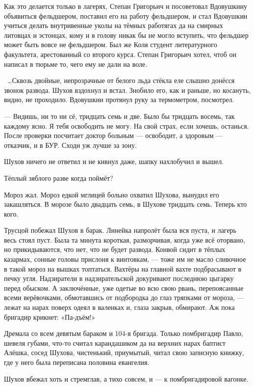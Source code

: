 Как это делается только в лагерях, Степан Григорьич и посоветовал Вдовушкину объявиться 
фельдшером, поставил его на работу фельдшером, и стал Вдовушкин учиться делать внутривенные 
уколы на тёмных работягах да на смирных литовцах и эстонцах, кому и в голову никак бы не 
могло вступить, что фельдшер может быть вовсе не фельдшером. Был же Коля студент 
литературного факультета, арестованный со второго курса. Степан Григорьич хотел, чтоб он 
написал в тюрьме то, чего ему не дали на воле.

~\dots{}Сквозь двойные, непрозрачные от белого льда стёкла еле слышно донёсся звонок развода. 
Шухов вздохнул и встал. Знобило его, как и раньше, но косануть, видно, не проходило. Вдовушкин 
протянул руку за термометром, посмотрел.

--- Видишь, ни то ни сё, тридцать семь и две. Было бы тридцать восемь, так каждому ясно. Я тебя 
освободить не могу. На свой страх, если хочешь, останься. После проверки посчитает доктор 
больным --- освободит, а здоровым --- отказчик, и в БУР. Сходи уж лучше за зону.

Шухов ничего не ответил и не кивнул даже, шапку нахлобучил и вышел.

Тёплый зяблого разве когда поймёт?

Мороз жал. Мороз едкой мглицей больно охватил Шухова, вынудил его закашляться. В морозе было 
двадцать семь, в Шухове тридцать семь. Теперь кто кого.

Трусцой побежал Шухов в барак. Линейка напролёт была вся пуста, и лагерь весь стоял пуст. 
Была та минута короткая, разморчивая, когда уже всё оторвано, но прикидываются, что нет, что 
не будет развода. Конвой сидит в тёплых казармах, сонные головы прислоня к винтовкам, --- тоже 
им не масло сливочное в такой мороз на вышках топтаться. Вахтёры на главной вахте 
подбрасывают в печку угля. Надзиратели в надзирательской докуривают последнюю цыгарку 
перед обыском. А заключённые, уже одетые во всю свою рвань, перепоясанные всеми верёвочками, 
обмотавшись от подбородка до глаз тряпками от мороза, --- лежат на нарах поверх одеял в 
валенках и, глаза закрыв, обмирают. Аж пока бригадир крикнет: «Па-дъём!»

Дремала со всем девятым бараком и 104-я бригада. Только помбригадир Павло, шевеля губами, 
что-то считал карандашиком да на верхних нарах баптист Алёшка, сосед Шухова, чистенький, 
приумытый, читал свою записную книжку, где у него была переписана половина евангелия.

Шухов вбежал хоть и стремглав, а тихо совсем, и --- к помбригадировой вагонке.

